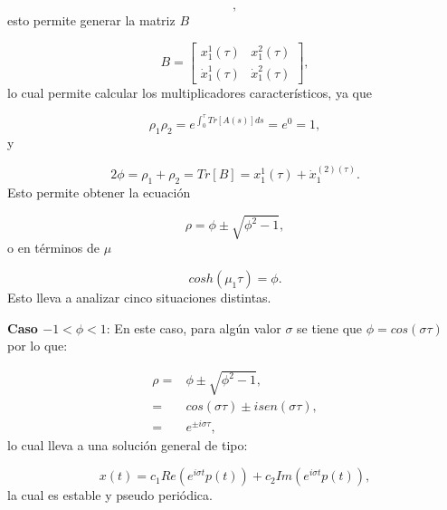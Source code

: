 \documentclass[10pt,a4paper]{report}
\begin{document}
\begin{equation}
[\begin{array}{c}
x_1^2(t) \\
\dot{x}_1^2(t)
\end{array}],
\end{equation} esto permite generar la matriz $B$

\begin{equation}
B= [\begin{array}{cc}

x_1^1(\tau) & x_1^2(\tau) \\
\dot{x}_1^1(\tau) & \dot{x}_1^2(\tau)

\end{array}],
\end{equation} lo cual permite calcular los multiplicadores característicos, ya que

\begin{equation}
\rho_1 \rho_2 = e^{\int_0^\tau Tr[A(s)]ds} = e^0 = 1,
\end{equation} y

\begin{equation}
 2\phi = \rho_1 + \rho_2 = Tr[B] =x_1^1(\tau)+ \dot{x}_1^{(2)(\tau)}.
\end{equation} Esto permite obtener la ecuación

\begin{equation}
\rho = \phi \pm \sqrt{\phi^2 -1},
\end{equation} o en términos de $\mu$

\begin{equation}
cosh(\mu_1 \tau) = \phi.
\end{equation} Esto lleva a analizar cinco situaciones distintas.

\textbf{Caso $ -1 < \phi < 1$}: En este caso, para algún valor $\sigma$ se tiene que $\phi = cos(\sigma \tau)$ por lo que:

\begin{align*}
\rho =& \phi \pm \sqrt{\phi^2 -1},\\
=& cos(\sigma \tau) \pm isen(\sigma \tau), \\
=& e^{\pm i\sigma \tau},
\end{align*} lo cual lleva a una solución general de tipo:

\begin{equation}
x(t) = c_1 Re(e^{i\sigma t} p(t)) + c_2 Im(e^{i\sigma t} p(t)),
\end{equation} la cual es estable y pseudo periódica.
\end{document}
